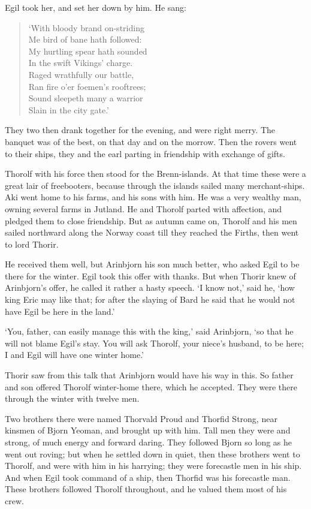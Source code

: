 Egil took her, and set her down by him. He sang:

\begin{verse}
`With bloody brand on-striding \\
Me bird of bane hath followed: \\
My hurtling spear hath sounded \\
In the swift Vikings' charge. \\
Raged wrathfully our battle, \\
Ran fire o'er foemen's rooftrees; \\
Sound sleepeth many a warrior \\
Slain in the city gate.' \\
\end{verse}

They two then drank together for the evening, and were right merry. The banquet was of the best, on that day and on the morrow. Then the rovers went to their ships, they and the earl parting in friendship with exchange of gifts.

Thorolf with his force then stood for the Brenn-islands. At that time these were a great lair of freebooters, because through the islands sailed many merchant-ships. Aki went home to his farms, and his sons with him. He was a very wealthy man, owning several farms in Jutland. He and Thorolf parted with affection, and pledged them to close friendship. But as autumn came on, Thorolf and his men sailed northward along the Norway coast till they reached the Firths, then went to lord Thorir.

He received them well, but Arinbjorn his son much better, who asked Egil to be there for the winter. Egil took this offer with thanks. But when Thorir knew of Arinbjorn's offer, he called it rather a hasty speech. `I know not,' said he, `how king Eric may like that; for after the slaying of Bard he said that he would not have Egil be here in the land.'

`You, father, can easily manage this with the king,' said Arinbjorn, `so that he will not blame Egil's stay. You will ask Thorolf, your niece's husband, to be here; I and Egil will have one winter home.'

Thorir saw from this talk that Arinbjorn would have his way in this. So father and son offered Thorolf winter-home there, which he accepted. They were there through the winter with twelve men.

Two brothers there were named Thorvald Proud and Thorfid Strong, near kinsmen of Bjorn Yeoman, and brought up with him. Tall men they were and strong, of much energy and forward daring. They followed Bjorn so long as he went out roving; but when he settled down in quiet, then these brothers went to Thorolf, and were with him in his harrying; they were forecastle men in his ship. And when Egil took command of a ship, then Thorfid was his forecastle man. These brothers followed Thorolf throughout, and he valued them most of his crew.

